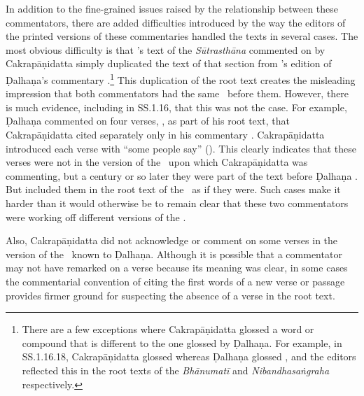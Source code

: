 In addition to the fine-grained issues raised by the relationship between these
commentators, there are added difficulties introduced by the way the editors of
the printed versions of these commentaries handled the texts in several cases. The
most obvious difficulty is that \citeauthor{acar-1939}'s text of the
\emph{Sūtrasthāna} commented on by Cakrapāṇidatta \citep{acar-1939} simply
duplicated the text of that section from \citeauthor{vulgate}'s edition of
Ḍalhaṇa's commentary \citep{vulgate}.\footnote{There are a few exceptions where
Cakrapāṇidatta glossed a word or compound that is different to the one glossed by
Ḍalhaṇa. For example, in SS.1.16.18, Cakrapāṇidatta glossed 
whereas Ḍalhaṇa glossed , and the editors reflected this in the
root texts of the \emph{Bhānumatī} \citep[130]{acar-1939} and
\emph{Nibandhasaṅgraha} \citep[79]{vulgate} respectively.} This duplication of the
root text creates the misleading impression that both commentators had the same
\SS\ before them. However, there is much evidence, including in SS.1.16, that this
was not the case. For example, Ḍalhaṇa commented on four verses,
, as part of his root text, that Cakrapāṇidatta cited
separately only in his commentary \citep[128–129]{acar-1939}.  Cakrapāṇidatta
introduced each verse with “some people say” (). This clearly
indicates that these verses were not in the version of the \SS\ upon which
Cakrapāṇidatta was commenting, but a century or so later they were part of the
text before Ḍalhaṇa .  But \citeauthor{acar-1939} included them in the root text
of the \SS\ as if they were.  Such cases make it harder than it would otherwise be
to remain clear that these two commentators were working off different versions of
the \SS.


Also, Cakrapāṇidatta did not acknowledge or comment on some verses in the version
of the \SS\ known to Ḍalhaṇa. Although it is possible that a commentator may not
have remarked on a verse because its meaning was clear, in some cases the
commentarial convention of citing the first words of a new verse or passage
provides firmer ground for suspecting the absence of a verse in the root text. 

